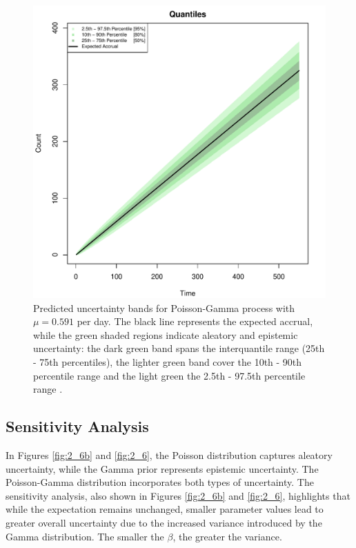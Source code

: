 \begin{figure}
\begin{knitrout}
\color{fgcolor}

{\centering \includegraphics[width=\textwidth-3cm]{figure/ch02_figunnamed-chunk-9-1} 

}


\end{knitrout}
  \caption{Predicted uncertainty bands for Poisson-Gamma process with $\mu = 0.591$ per day. The black line represents the expected accrual, while the green shaded regions indicate aleatory and epistemic uncertainty: the dark green band spans the interquantile range (25th - 75th percentiles), the lighter green band cover the 10th - 90th percentile range and the light green the 2.5th - 97.5th percentile range \citep{spiegelhalter2011visualizing}.}
  \label{fig:2_8}
\end{figure}

\subsection{Sensitivity Analysis}

In Figures \ref{fig:2_6b} and \ref{fig:2_6}, the Poisson distribution captures aleatory uncertainty, while the Gamma prior represents epistemic uncertainty. The Poisson-Gamma distribution incorporates both types of uncertainty. The sensitivity analysis, also shown in Figures \ref{fig:2_6b} and \ref{fig:2_6}, highlights that while the expectation remains unchanged, smaller parameter values lead to greater overall uncertainty due to the increased variance introduced by the Gamma distribution. The smaller the $\beta$, the greater the variance.


